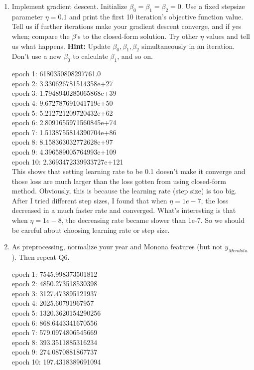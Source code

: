 \documentclass[a4paper]{article}
\theoremstyle{definition}
\newenvironment{soln}{
    \leavevmode\color{blue}\ignorespaces
}{}
\begin{document}
\begin{enumerate}
\item
Implement gradient descent.  Initialize $\beta_0= \beta_1= \beta_2=0$.  Use a fixed stepsize parameter $\eta=0.1$ and print the first 10 iteration's objective function value.
Tell us if further iterations make your gradient descent converge, and if yes when; compare the $\beta$'s to the closed-form solution.
Try other $\eta$ values and tell us what happens.
\textbf{Hint:} Update $\beta_0, \beta_1, \beta_2$ simultaneously in an iteration.  Don't use a new $\beta_0$ to calculate $\beta_1$, and so on.

\begin{soln}
epoch 1:  6180350808297761.0\\
epoch 2:  3.330626781514358e+27\\
epoch 3:  1.7948940285065868e+39\\
epoch 4:  9.672787691041719e+50\\
epoch 5:  5.212721209720432e+62\\
epoch 6:  2.8091655971560845e+74\\
epoch 7:  1.5138755814390704e+86\\
epoch 8:  8.158363032772628e+97\\
epoch 9:  4.396589005764993e+109\\
epoch 10:  2.3693472339933727e+121\\

This shows that setting learning rate to be 0.1 doesn't make it converge and those loss are much larger than the loss gotten from using closed-form method.
Obviously, this is because the learning rate (step size) is too big. After I tried different step sizes, I found that when $\eta = 1e-7$, the loss decreased in a much faster rate and converged. What's interesting is that when $\eta = 1e-8$, the decreasing rate became slower than 1e-7. So we should be careful about choosing learning rate or step size.

\end{soln}


\item
As preprocessing, normalize your year and Monona features (but not $y_{Mendota}$).
Then repeat Q6.

\begin{soln}
epoch 1:  7545.998373501812\\
epoch 2:  4850.273518530398\\
epoch 3:  3127.473895121937\\
epoch 4:  2025.60791967957\\
epoch 5:  1320.3620154290256\\
epoch 6:  868.6443341670556\\
epoch 7:  579.0974806545669\\
epoch 8:  393.3511885316234\\
epoch 9:  274.0870881867737\\
epoch 10:  197.4318389691094\\
\end{soln}


\end{enumerate}
\end{document}
